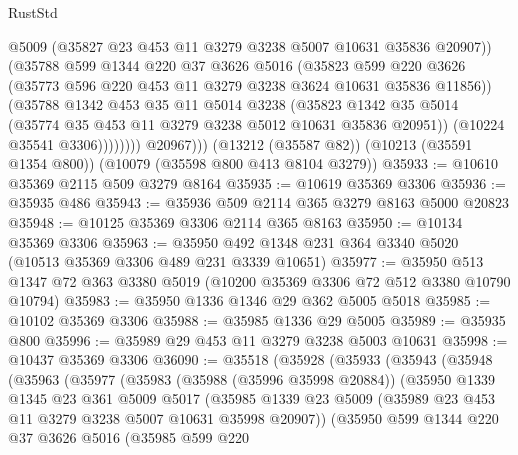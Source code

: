 \begin{lexlean}{RustStd}
\begin{coremodule}
{\begin{coremodule}
{{{{{{{{{{{{{{{{{{{{{{{{{{                      @5009
                      (@35827 @23 @453 @11 @3279 @3238 @5007 @10631 @35836 @20907))
                    (@35788
                      @599
                      @1344
                      @220
                      @37
                      @3626
                      @5016
                      (@35823
                        @599
                        @220
                        @3626
                        (@35773 @596 @220 @453 @11 @3279 @3238 @3624 @10631 @35836 @11856))
                      (@35788
                        @1342
                        @453
                        @35
                        @11
                        @5014
                        @3238
                        (@35823
                          @1342
                          @35
                          @5014
                          (@35774 @35 @453 @11 @3279 @3238 @5012 @10631 @35836 @20951))
                        (@10224 @35541 @3306))))))))
          @20967)))
    (@13212 (@35587 @82))
    (@10213 (@35591 @1354 @800))
    (@10079 (@35598 @800 @413 @8104 @3279))
@35933 := @10610 @35369 @2115 @509 @3279 @8164
@35935 := @10619 @35369 @3306
@35936 := @35935 @486
@35943 := @35936 @509 @2114 @365 @3279 @8163 @5000 @20823
@35948 := @10125 @35369 @3306 @2114 @365 @8163
@35950 := @10134 @35369 @3306
@35963 := @35950 @492 @1348 @231 @364 @3340 @5020 (@10513 @35369 @3306 @489 @231 @3339 @10651)
@35977 := @35950 @513 @1347 @72 @363 @3380 @5019 (@10200 @35369 @3306 @72 @512 @3380 @10790 @10794)
@35983 := @35950 @1336 @1346 @29 @362 @5005 @5018
@35985 := @10102 @35369 @3306
@35988 := @35985 @1336 @29 @5005
@35989 := @35935 @800
@35996 := @35989 @29 @453 @11 @3279 @3238 @5003 @10631
@35998 := @10437 @35369 @3306
@36090 := @35518
    (@35928
      (@35933
        (@35943
          (@35948
            (@35963
              (@35977
                (@35983
                  (@35988 (@35996 @35998 @20884))
                  (@35950
                    @1339
                    @1345
                    @23
                    @361
                    @5009
                    @5017
                    (@35985
                      @1339
                      @23
                      @5009
                      (@35989 @23 @453 @11 @3279 @3238 @5007 @10631 @35998 @20907))
                    (@35950
                      @599
                      @1344
                      @220
                      @37
                      @3626
                      @5016
                      (@35985
                        @599
                        @220
}}}}}}}}}}}}}}}}}}}}}}}}}}
\end{coremodule}}
\end{coremodule}
\end{lexlean}
